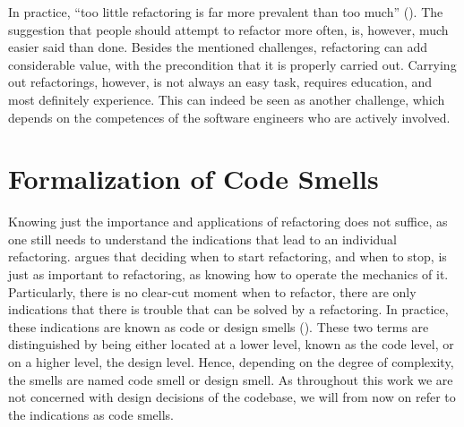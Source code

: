 In practice, 
	“too little refactoring is far more prevalent than too much” 
	(\cite[p.56]{fowler2018}).
The suggestion that people should attempt to refactor more often, 
	is, however, much easier said than done.
Besides the mentioned challenges, 
	refactoring can add considerable value, 
	with the precondition that it is properly carried out.
Carrying out refactorings, however, is not always an easy task, 
	requires education, and most definitely experience.
This can indeed be seen as another challenge, 
	which depends on the competences of the software engineers who are actively involved.





\section{Formalization of Code Smells}

Knowing just the importance and applications of refactoring does not suffice, 
	as one still needs to understand the indications 
	that lead to an individual refactoring.
\textcite[p.~71]{fowler2018} argues that deciding when to start refactoring,
	and when to stop,
	is just as important to refactoring,
	as knowing how to operate the mechanics of it.
Particularly, there is no clear-cut moment when to refactor, 
	there are only indications 
	that there is trouble that can be solved by a refactoring.
In practice, 
	these indications are known as code or design smells 
	(\cite[p.~2]{lacerda2020}).
These two terms are distinguished by being either located at a lower level,
	known as the code level, or on a higher level, 
	the design level. 
Hence, 
	depending on the degree of complexity, 
	the smells are named code smell or design smell.
As throughout this work we are not concerned 
	with design decisions of the codebase, 
	we will from now on refer to the indications as code smells.

